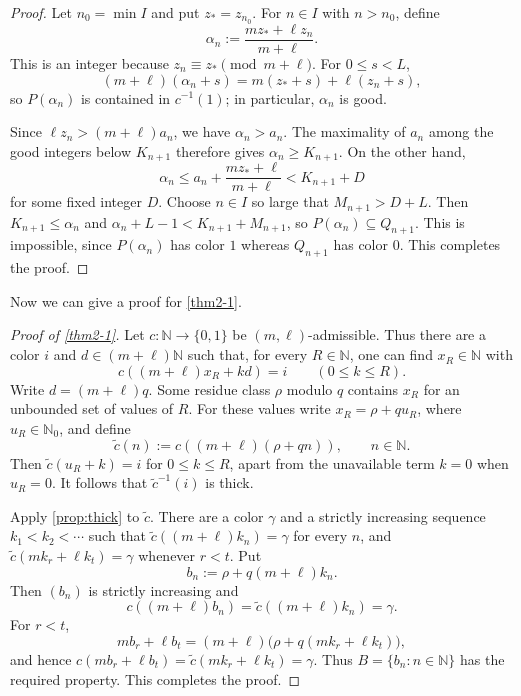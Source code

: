 \documentclass[reqno,12pt]{amsart}
\def \N {\mathbb N}
\numberwithin{equation}{section}
\begin{document}
\begin{proof}
Let $n_0=\min I$ and put $z_*=z_{n_0}$. For $n\in I$ with $n>n_0$, define
\[
\alpha_n:=\frac{mz_*+\ell z_n}{m+\ell}.
\]
This is an integer because $z_n\equiv z_*\pmod{m+\ell}$. For $0\leq s<L$,
\[
(m+\ell)(\alpha_n+s)=m(z_*+s)+\ell(z_n+s),
\]
so $P(\alpha_n)$ is contained in $c^{-1}(1)$; in particular, $\alpha_n$ is good.

Since $\ell z_n>(m+\ell)a_n$, we have $\alpha_n>a_n$. The maximality of $a_n$ among the good integers below $K_{n+1}$ therefore gives $\alpha_n\geq K_{n+1}$. On the other hand,
\[
\alpha_n\leq a_n+\frac{mz_*+\ell}{m+\ell}<K_{n+1}+D
\]
for some fixed integer $D$. Choose $n\in I$ so large that $M_{n+1}>D+L$. Then $K_{n+1}\leq\alpha_n$ and $\alpha_n+L-1<K_{n+1}+M_{n+1}$, so $P(\alpha_n)\subseteq Q_{n+1}$. This is impossible, since $P(\alpha_n)$ has color $1$ whereas $Q_{n+1}$ has color $0$. This completes the proof.
\end{proof}

Now we can give a proof for \cref{thm2-1}.

\begin{proof}[Proof of \cref{thm2-1}]
Let $c:\N\to\{0,1\}$ be $(m,\ell)$-admissible. Thus there are a color $i$ and $d\in(m+\ell)\N$ such that, for every $R\in\N$, one can find $x_R\in\N$ with
\[
c((m+\ell)x_R+kd)=i\qquad(0\leq k\leq R).
\]
Write $d=(m+\ell)q$. Some residue class $\rho$ modulo $q$ contains $x_R$ for an unbounded set of values of $R$. For these values write $x_R=\rho+qu_R$, where $u_R\in\N_0$, and define
\[
\widetilde c(n):=c((m+\ell)(\rho+qn)),\qquad n\in\N.
\]
Then $\widetilde c(u_R+k)=i$ for $0\leq k\leq R$, apart from the unavailable term $k=0$ when $u_R=0$. It follows that $\widetilde c^{-1}(i)$ is thick.

Apply \cref{prop:thick} to $\widetilde c$. There are a color $\gamma$ and a strictly increasing sequence $k_1<k_2<\cdots$ such that $\widetilde c((m+\ell)k_n)=\gamma$ for every $n$, and $\widetilde c(mk_r+\ell k_t)=\gamma$ whenever $r<t$. Put
\[
b_n:=\rho+q(m+\ell)k_n.
\]
Then $(b_n)$ is strictly increasing and
\[
c((m+\ell)b_n)=\widetilde c((m+\ell)k_n)=\gamma.
\]
For $r<t$,
\[
mb_r+\ell b_t=(m+\ell)\bigl(\rho+q(mk_r+\ell k_t)\bigr),
\]
and hence $c(mb_r+\ell b_t)=\widetilde c(mk_r+\ell k_t)=\gamma$. Thus $B=\{b_n:n\in\N\}$ has the required property. This completes the proof.
\end{proof}
\end{document}
